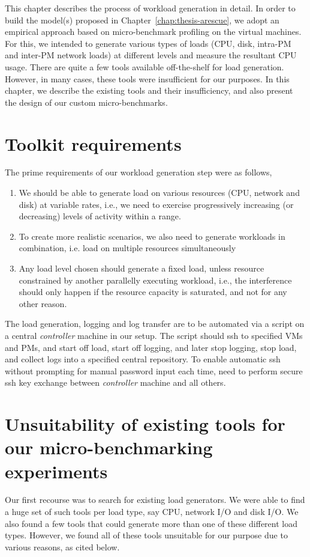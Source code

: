 This chapter describes the process of workload generation in detail. 
In order to build the model(s) proposed in Chapter~\ref{chap:thesis-arescue},
we adopt an empirical approach based on micro-benchmark profiling on the virtual
machines. For this, we intended to generate various types of loads 
(CPU, disk, intra-PM and inter-PM network loads) at different levels 
and measure the resultant CPU usage. There are quite a few tools 
available off-the-shelf for load generation. However, in many cases, these tools were
insufficient for our purposes. In this chapter, we describe the existing 
tools and their insufficiency, and also present the design of our
custom micro-benchmarks.

\section{Toolkit requirements}
The prime requirements of our workload generation step were as follows,
\begin{enumerate}
  \item We should be able to generate
load on various resources (CPU, network and disk) at variable rates, i.e., we need to exercise
progressively increasing (or decreasing) levels of activity within a range. 
  \item To create more realistic scenarios, we also need to generate workloads in combination, i.e.
load on multiple resources simultaneously
  \item Any load level chosen should generate a fixed
load, unless resource constrained by another parallelly executing workload, i.e., the interference
should only happen if the resource capacity is saturated, and not for any other reason.
\end{enumerate}

The load generation, logging and log transfer are to be automated via a script on a central
\textit{controller} machine in our setup. The script should ssh to specified VMs and PMs,
and start off load, start off logging, and later stop logging, stop load, and collect logs
into a specified central repository. To enable automatic ssh without prompting for manual
password input each time, 
need to perform secure ssh key exchange between \textit{controller} machine and all others.


\section{Unsuitability of existing tools for our micro-benchmarking experiments}
Our
first recourse was to search for existing load generators. We were able to find a huge set of
such tools per load type, say CPU, network I/O and disk I/O. We also found a few tools that
could generate more than one of these different load types. However, we found all of these tools
unsuitable for our purpose due to various reasons, as cited below.

